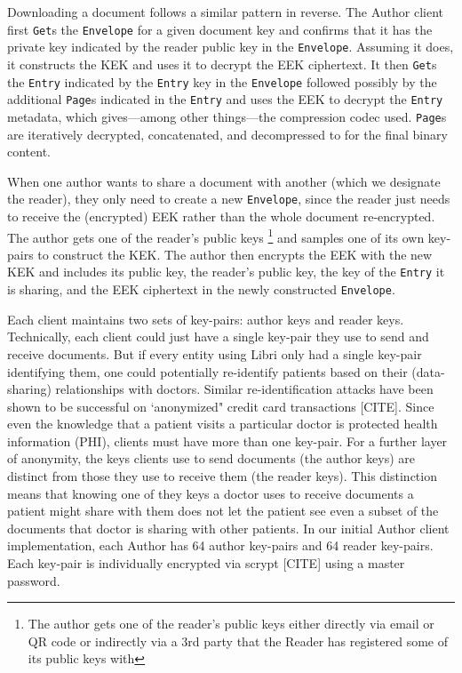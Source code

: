 \documentclass[10pt]{article}
\newcommand{\ttt}[1]{\texttt{#1}}
\def\Entry{\ttt{Entry}}
\def\Page{\ttt{Page}}
\def\Envelope{\ttt{Envelope}}
\begin{document}
Downloading a document follows a similar pattern in reverse. The Author client first \ttt{Get}s the \Envelope{} for a given document key and confirms that it has the private key indicated by the reader public key in the \Envelope{}. Assuming it does, it constructs the KEK and uses it to decrypt the EEK ciphertext. It then \texttt{Get}s the \Entry{} indicated by the \Entry{} key in the \Envelope{} followed possibly by the additional \Page{}s indicated in the \Entry{} and uses the EEK to decrypt the \Entry{} metadata, which gives---among other things---the compression codec used. \Page{}s are iteratively decrypted, concatenated, and decompressed to for the final binary content. 

When one author wants to share a document with another (which we designate the reader), they only need to create a new \Envelope{}, since the reader just needs to receive the (encrypted) EEK rather than the whole document re-encrypted. The author gets one of the reader's public keys \footnote{The author gets one of the reader's public keys either directly via email or QR code or indirectly via a 3rd party that the Reader has registered some of its public keys with} and samples one of its own key-pairs to construct the KEK. The author then encrypts the EEK with the new KEK and includes its public key, the reader's public key, the key of the \Entry{} it is sharing, and the EEK ciphertext in the newly constructed \Envelope{}. 

Each client maintains two sets of key-pairs: author keys and reader keys. Technically, each client could just have a single key-pair they use to send and receive documents. But if every entity using Libri only had a single key-pair identifying them, one could potentially re-identify patients based on their (data-sharing) relationships with doctors. Similar re-identification attacks have been shown to be successful on `anonymized" credit card transactions [CITE]. Since even the knowledge that a patient visits a particular doctor is protected health information (PHI), clients must have more than one key-pair. For a further layer of anonymity, the keys clients use to send documents (the author keys) are distinct from those they use to receive them (the reader keys). This distinction means that knowing one of they keys a doctor uses to receive documents a patient might share with them does not let the patient see even a subset of the documents that doctor is sharing with other patients. In our initial Author client implementation, each Author has 64 author key-pairs and 64 reader key-pairs. Each key-pair is individually encrypted via scrypt [CITE] using a master password.
\end{document}
